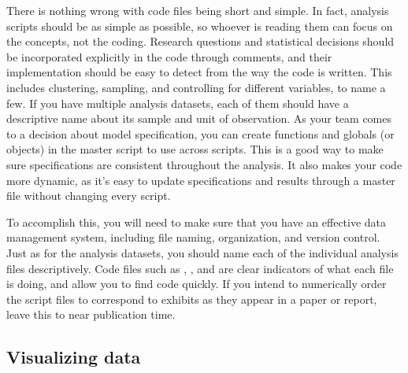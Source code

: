 There is nothing wrong with code files being short and simple.
In fact, analysis scripts should be as simple as possible,
so whoever is reading them can focus on the concepts, not the coding.
Research questions and statistical decisions should be incorporated explicitly in the code through comments,
and their implementation should be easy to detect from the way the code is written.
This includes clustering, sampling, and controlling for different variables, to name a few.
If you have multiple analysis datasets,
each of them should have a descriptive name about its sample and unit of observation.
As your team comes to a decision about model specification,
you can create functions and globals (or objects) in the master script to use across scripts.
This is a good way to make sure specifications are consistent throughout the analysis.
It also makes your code more dynamic,
as it's easy to update specifications and results 
through a master file without changing every script.


To accomplish this, you will need to make sure that you have an effective data management system,
including file naming, organization, and version control.
Just as for the analysis datasets,
you should name each of the individual analysis files descriptively.
Code files such as ,
, and 
are clear indicators of what each file is doing, and allow you to find code quickly.
If you intend to numerically order the script files 
to correspond to exhibits as they appear in a paper or report,
leave this to near publication time.

\subsection{Visualizing data}


